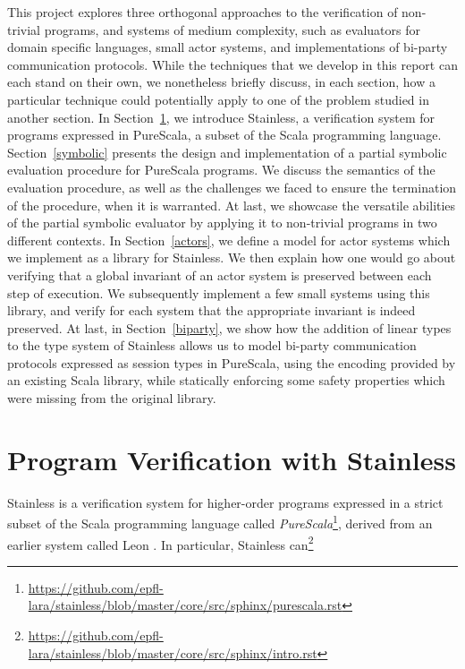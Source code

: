 \documentclass[a4paper,twoside]{article}
\newcommand{\RefSec}[1]{Section~\ref{#1}}
\begin{document}
This project explores three orthogonal approaches to the verification of non-trivial programs, and systems of medium complexity, such as evaluators for domain specific languages, small actor systems, and implementations of bi-party communication protocols. While the techniques that we develop in this report can each stand on their own, we nonetheless briefly discuss, in each section, how a particular technique could potentially apply to one of the problem studied in another section. In \RefSec{verif}, we introduce Stainless, a verification system for programs expressed in PureScala, a subset of the Scala programming language. \RefSec{symbolic} presents the design and implementation of a partial symbolic evaluation procedure for PureScala programs. We discuss the semantics of the evaluation procedure, as well as the challenges we faced to ensure the termination of the procedure, when it is warranted. At last, we showcase the versatile abilities of the partial symbolic evaluator by applying it to non-trivial programs in two different contexts. In \RefSec{actors}, we define a model for actor systems which we implement as a library for Stainless. We then explain how one would go about verifying that a global invariant of an actor system is preserved between each step of execution. We subsequently implement a few small systems using this library, and verify for each system that the appropriate invariant is indeed preserved. At last, in \RefSec{biparty}, we show how the addition of linear types to the type system of Stainless allows us to model bi-party communication protocols expressed as session types in PureScala, using the encoding provided by an existing Scala library, while statically enforcing some safety properties which were missing from the original library.

\clearpage
\section{Program Verification with Stainless}
\label{verif}

Stainless \cite{voirol2016automating} is a verification system for higher-order programs expressed in a strict subset of the Scala programming language called \textit{PureScala}\footnote{\url{https://github.com/epfl-lara/stainless/blob/master/core/src/sphinx/purescala.rst}}, derived from an earlier system called Leon \cite{Suter:2011:SMR:2041552.2041575}. In particular, Stainless can\footnote{\url{https://github.com/epfl-lara/stainless/blob/master/core/src/sphinx/intro.rst}}
\end{document}
